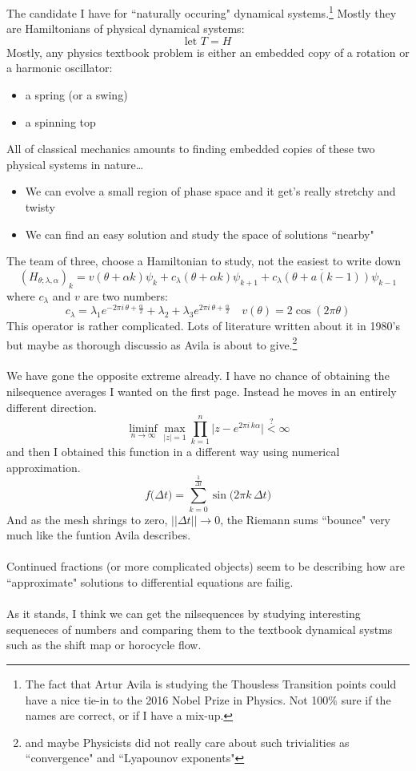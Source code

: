 \documentclass[12pt]{article}
\begin{document}
\noindent The candidate I have for ``naturally occuring" dynamical systems.\footnote{The fact that Artur Avila is studying the Thousless Transition points could have a nice tie-in to the 2016 Nobel Prize in Physics.  Not 100\% sure if the names are correct, or if I have a mix-up.}  Mostly they are Hamiltonians of physical dynamical systems:
$$ \boxed{\text{let }T = H} $$
Mostly, any physics textbook problem is either an embedded copy of a rotation or a harmonic oscillator:
\begin{itemize}
\item a spring (or a swing)
\item a spinning top
\end{itemize}
All of classical mechanics amounts to finding embedded copies of these two physical systems in nature\dots 
\begin{itemize}
\item We can evolve a small region of phase space and it get's really stretchy and twisty
\item We can find an easy solution and study the space of solutions ``nearby"
\end{itemize}
The team of three, choose a Hamiltonian to study, not the easiest to write down
$$ (H_{\theta; \lambda, \alpha })_k 
= v(\theta +  \alpha k) \psi_k 
+ c_\lambda (\theta + \alpha k) \psi_{k+1} + 
\overline{c_\lambda (\theta + a(k-1)) } \psi_{k-1}  $$
where $c_\lambda$ and $v$ are two numbers:
$$c_\lambda = \lambda_1 e^{-2\pi i \, \theta + \frac{\alpha}{2}}  + \lambda_2 + \lambda_3 e^{2\pi i \, \theta + \frac{\alpha}{2}} \quad v(\theta ) = 2 \cos (2\pi \theta) $$
This operator is rather complicated.  Lots of literature written about it in 1980's but maybe as thorough discussio as Avila is about to give.\footnote{and maybe Physicists did not really care about  such trivialities as ``convergence" and ``Lyapounov exponents"} \\ \\
We have gone the opposite extreme already.  I have no chance of obtaining the nilsequence averages I wanted on the first page.  Instead he moves in an entirely different direction. 
$$ \liminf_{n \to \infty} \max_{|z|=1} \prod_{k=1}^n \big|z - e^{2\pi i \, k \alpha } \big| \stackrel{?}{<} \infty  $$
and then I obtained this function in a different way using numerical approximation.
$$ f \big (\Delta t \big) = \sum_{k=0}^{\frac{1}{\Delta t}} \sin \big( 2\pi k \, \Delta t \big) $$
And as the mesh shrings to zero, $||\Delta t|| \to 0$, the Riemann sums ``bounce" very much like the funtion Avila describes.  \\ \\
Continued fractions (or more complicated objects) seem to be describing how are ``approximate" solutions to differential equations are failig.  \\ \\
As it stands, I think we can get the nilsequences by studying interesting sequeneces of numbers and comparing them to the textbook dynamical systms such as the shift map or horocycle flow.
\end{document}
